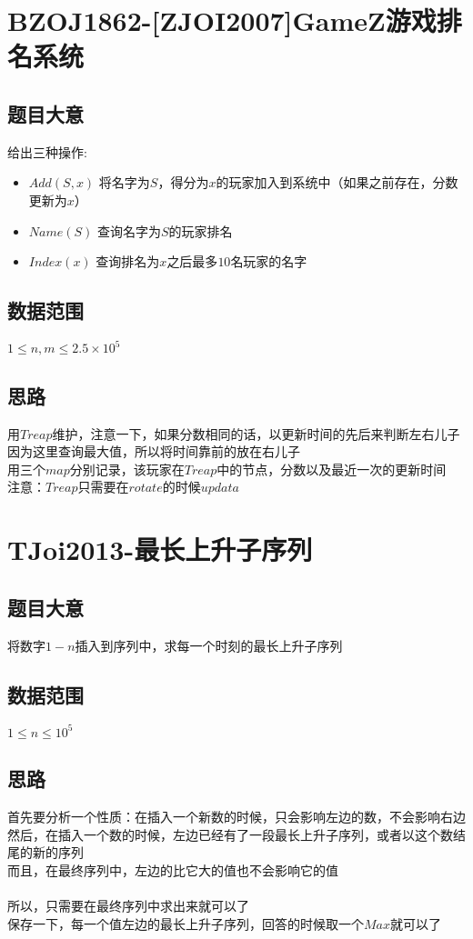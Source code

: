 \documentclass{ctexart}
\numberwithin{equation}{section}
\begin{document}
\begin{flushleft}
  \section{BZOJ1862-[ZJOI2007]GameZ游戏排名系统}
  \subsection{题目大意}
  给出三种操作:\\
  \begin{itemize}
  \item $Add(S,x)$ 将名字为$S$，得分为$x$的玩家加入到系统中（如果之前存在，分数更新为$x$）
  \item $Name(S)$ 查询名字为$S$的玩家排名
  \item $Index(x)$ 查询排名为$x$之后最多$10$名玩家的名字
  \end{itemize}
  \subsection{数据范围}
  $1\le n,m \le 2.5\times 10^5$
  \subsection{思路}
  用$Treap$维护，注意一下，如果分数相同的话，以更新时间的先后来判断左右儿子\\
  因为这里查询最大值，所以将时间靠前的放在右儿子\\

  用三个$map$分别记录，该玩家在$Treap$中的节点，分数以及最近一次的更新时间\\
  注意：$Treap$只需要在$rotate$的时候$updata$\\
  \newpage

  \section{TJoi2013-最长上升子序列}
  \subsection{题目大意}
  将数字$1-n$插入到序列中，求每一个时刻的最长上升子序列\\
  \subsection{数据范围}
  $1\le n \le 10^5$
  \subsection{思路}
  首先要分析一个性质：在插入一个新数的时候，只会影响左边的数，不会影响右边\\
  然后，在插入一个数的时候，左边已经有了一段最长上升子序列，或者以这个数结尾的新的序列\\
  而且，在最终序列中，左边的比它大的值也不会影响它的值\\
  ~\\
  所以，只需要在最终序列中求出来就可以了\\
  保存一下，每一个值左边的最长上升子序列，回答的时候取一个$Max$就可以了\\
  \newpage


\end{flushleft}
\end{document}
